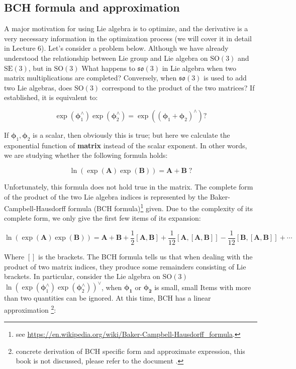 \subsection{BCH formula and approximation}

A major motivation for using Lie algebra is to optimize, and the derivative is a very necessary information in the optimization process (we will cover it in detail in Lecture 6). Let's consider a problem below. Although we have already understood the relationship between Lie group and Lie algebra on $\mathrm{SO}(3)$ and $\mathrm{SE}(3)$, but in $\mathrm{SO}(3)$ What happens to $\mathfrak{so}(3)$ in Lie algebra when two matrix multiplications are completed? Conversely, when $\mathfrak{so}(3)$ is used to add two Lie algebras, does $\mathrm{SO}(3)$ correspond to the product of the two matrices? If established, it is equivalent to:

\[
  \exp \left( {\boldsymbol{\phi} _1^ \wedge } \right)\exp \left( {\boldsymbol{\phi} _2^ \wedge } \right) = \exp \left( {{{\left( {{\boldsymbol{\phi} _1} + {\boldsymbol{\phi} _2}} \right)}^ \wedge }} \right) ?
\]

If $\boldsymbol{\phi}_1, \boldsymbol{\phi}_2$ is a scalar, then obviously this is true; but here we calculate the exponential function of \textbf{matrix} instead of the scalar exponent. In other words, we are studying whether the following formula holds:

\[
  \ln \left( \exp \left( \bm{A} \right) \exp \left( \bm{B} \right) \right) = \bm{A} + \bm{B} \; ?
\]

Unfortunately, this formula does not hold true in the matrix. The complete form of the product of the two Lie algebra indices is represented by the Baker-Campbell-Hausdorff formula (BCH formula)\footnote{ see \url{https://en.wikipedia.org/wiki/Baker-Campbell-Hausdorff\_formula}. } given. Due to the complexity of its complete form, we only give the first few items of its expansion:

\begin{equation}
  \ln \left( {\exp \left( \bm{A} \right)\exp \left( \bm{B} \right)} \right) = \bm{A} + \bm{B} + \frac{1}{2}\left[ {\bm{A}, \bm{B}} \right] + \frac{1}{{12}}\left[ {\bm{A},\left[ {\bm{A}, \bm{B}} \right]} \right] - \frac{1}{{12}}\left[ {\bm{B},\left[ {\bm{A},\bm{B}} \right]} \right] +  \cdots
\end{equation}

Where $[]$ is the brackets. The BCH formula tells us that when dealing with the product of two matrix indices, they produce some remainders consisting of Lie brackets. In particular, consider the Lie algebra on $\mathrm{SO}(3)$$\ln { \left( {\exp \left( { \boldsymbol{\phi} _1^ \wedge } \right)\exp \left ( {\boldsymbol{\phi} _2^ \wedge } \right)} \right) ^ \vee }$, when $\boldsymbol{\phi_1}$ or $\boldsymbol{\phi_2}$ is small, small Items with more than two quantities can be ignored. At this time, BCH has a linear approximation \footnote{ concrete derivation of BCH specific form and approximate expression, this book is not discussed, please refer to the document \cite{Barfoot2016}. }:

